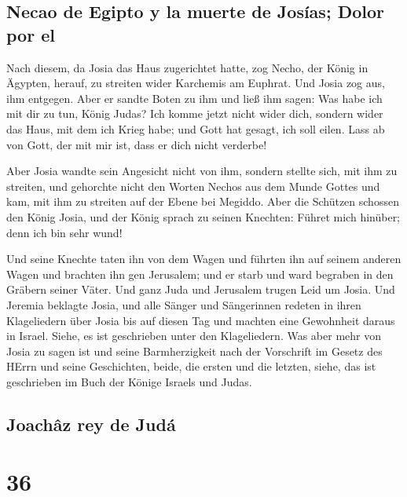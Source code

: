 \hypertarget{necao-de-egipto-y-la-muerte-de-josuxedas-dolor-por-el}{%
\subsection{Necao de Egipto y la muerte de Josías; Dolor por
el}\label{necao-de-egipto-y-la-muerte-de-josuxedas-dolor-por-el}}

 Nach diesem, da Josia das Haus zugerichtet hatte, zog
Necho, der König in Ägypten, herauf, zu streiten wider Karchemis am
Euphrat. Und Josia zog aus, ihm entgegen.  Aber er sandte
Boten zu ihm und ließ ihm sagen: Was habe ich mit dir zu tun, König
Judas? Ich komme jetzt nicht wider dich, sondern wider das Haus, mit dem
ich Krieg habe; und Gott hat gesagt, ich soll eilen. Lass ab von Gott,
der mit mir ist, dass er dich nicht verderbe!

 Aber Josia wandte sein Angesicht nicht von ihm, sondern
stellte sich, mit ihm zu streiten, und gehorchte nicht den Worten Nechos
aus dem Munde Gottes und kam, mit ihm zu streiten auf der Ebene bei
Megiddo.  Aber die Schützen schossen den König Josia, und
der König sprach zu seinen Knechten: Führet mich hinüber; denn ich bin
sehr wund!

 Und seine Knechte taten ihn von dem Wagen und führten
ihn auf seinem anderen Wagen und brachten ihn gen Jerusalem; und er
starb und ward begraben in den Gräbern seiner Väter. Und ganz Juda und
Jerusalem trugen Leid um Josia.  Und Jeremia beklagte
Josia, und alle Sänger und Sängerinnen redeten in ihren Klageliedern
über Josia bis auf diesen Tag und machten eine Gewohnheit daraus in
Israel. Siehe, es ist geschrieben unter den Klageliedern.
 Was aber mehr von Josia zu sagen ist und seine
Barmherzigkeit nach der Vorschrift im Gesetz des HErrn 
und seine Geschichten, beide, die ersten und die letzten, siehe, das ist
geschrieben im Buch der Könige Israels und Judas.

\hypertarget{joachuxe2z-rey-de-juduxe1}{%
\subsection{Joachâz rey de Judá}\label{joachuxe2z-rey-de-juduxe1}}

\hypertarget{section-35}{%
\section{36}\label{section-35}}


